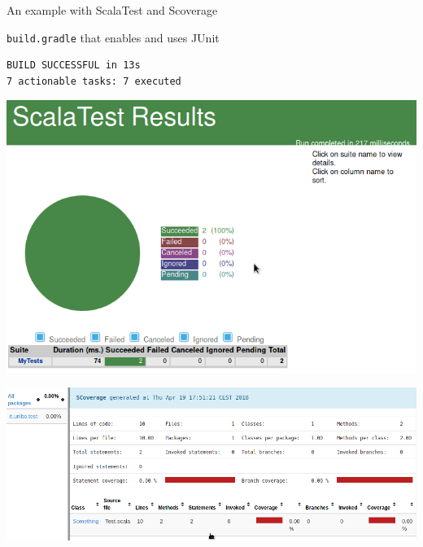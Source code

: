 \documentclass[presentation]{beamer}
\begin{document}
\begin{frame}{An example with ScalaTest and Scoverage}
\begin{block}{\texttt{build.gradle} that enables and uses JUnit}
\begin{verbatim}
BUILD SUCCESSFUL in 13s
7 actionable tasks: 7 executed
		\end{verbatim}
	\end{block}
	\begin{center}
		\includegraphics[width=.90\textwidth]{images/scalatest}
	\end{center}
	\begin{center}
		\includegraphics[width=\textwidth]{images/scoverage}
	\end{center}
\end{frame}
\end{document}
